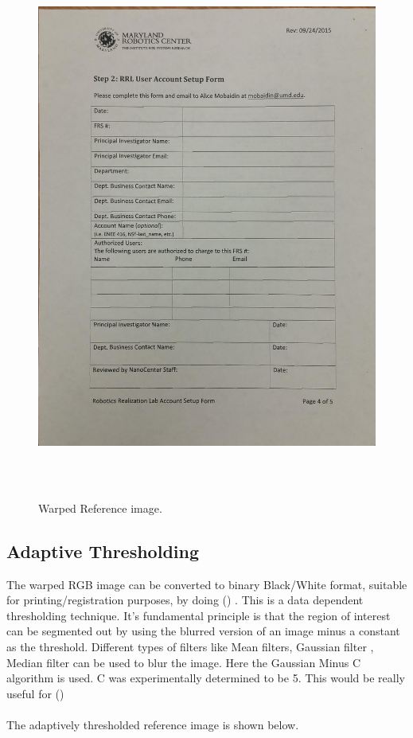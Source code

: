 \begin{figure}[th]
	\centering
	\includegraphics[height=18cm ]{Figures/warped_image}
	\caption[Warped Reference Image]{Warped Reference image.}
	\label{fig:WarpedReferenceImage}
\end{figure}

\pagebreak

\subsection{Adaptive Thresholding}

The warped RGB image can be converted to binary Black/White format, suitable for printing/registration purposes, by doing  (\cite{Reference10}) . This is a data dependent thresholding technique. It's fundamental principle is that the region of interest can be segmented out by using the blurred version of an image minus a constant as the threshold. Different types of filters like Mean filters, Gaussian filter , Median filter can be used to blur the image. Here the Gaussian Minus C algorithm is used. C was experimentally determined to be 5. This would be really useful for  (\cite{Reference14}) \. \\ \\ The adaptively thresholded reference image is shown below. \\

